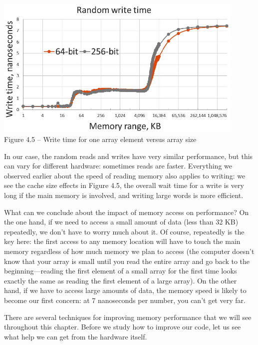 \hspace*{\fill} \\ %
\begin{center}
\includegraphics[width=0.9\textwidth]{content/1/chapter4/images/5.jpg}\\
Figure 4.5 – Write time for one array element versus array size
\end{center}

In our case, the random reads and writes have very similar performance, but this can vary for different hardware: sometimes reads are faster. Everything we observed earlier about the speed of reading memory also applies to writing: we see the cache size effects in Figure 4.5, the overall wait time for a write is very long if the main memory is involved, and writing large words is more efficient.

What can we conclude about the impact of memory access on performance? On the one hand, if we need to access a small amount of data (less than 32 KB) repeatedly, we don't have to worry much about it. Of course, repeatedly is the key here: the first access to any memory location will have to touch the main memory regardless of how much memory we plan to access (the computer doesn't know that your array is small until you read the entire array and go back to the beginning—reading the first element of a small array for the first time looks exactly the same as reading the first element of a large array). On the other hand, if we have to access large amounts of data, the memory speed is likely to become our first concern: at 7 nanoseconds per number, you can't get very far.

There are several techniques for improving memory performance that we will see throughout this chapter. Before we study how to improve our code, let us see what help we can get from the hardware itself.


